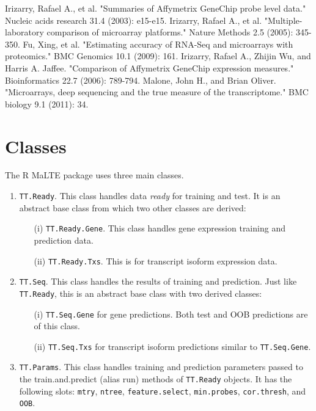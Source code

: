 \documentclass[a4paper,12pt]{article}
\begin{document}
\begin{thebibliography}{50}

 Irizarry, Rafael A., et al. "Summaries of Affymetrix GeneChip probe level data." Nucleic acids research 31.4 (2003): e15-e15.
 Irizarry, Rafael A., et al. "Multiple-laboratory comparison of microarray platforms." Nature Methods 2.5 (2005): 345-350.
 Fu, Xing, et al. "Estimating accuracy of RNA-Seq and microarrays with proteomics." BMC Genomics 10.1 (2009): 161.
 Irizarry, Rafael A., Zhijin Wu, and Harris A. Jaffee. "Comparison of Affymetrix GeneChip expression measures." Bioinformatics 22.7 (2006): 789-794.
 Malone, John H., and Brian Oliver. "Microarrays, deep sequencing and the true measure of the transcriptome." BMC biology 9.1 (2011): 34.

\end{thebibliography}

\pagebreak
\appendix
\section{Classes}
\label{classes}
The \textsf{R} \textsf{MaLTE} package uses three main classes.
\begin{enumerate}
\item \texttt{TT.Ready}. This class handles data \textit{ready} for training and test. It is an abstract base class from which two other classes are derived:
\begin{enumerate}
\item[(i)] \texttt{TT.Ready.Gene}. This class handles gene expression training and prediction data.
\item[(ii)] \texttt{TT.Ready.Txs}. This is for transcript isoform expression data.
\end{enumerate}

\item \texttt{TT.Seq}. This class handles the results of training and prediction. Just like \texttt{TT.Ready}, this is an abstract base class with two derived classes:
\begin{enumerate}
\item[(i)] \texttt{TT.Seq.Gene} for gene predictions. Both test and OOB predictions are of this class.
\item[(ii)] \texttt{TT.Seq.Txs} for transcript isoform predictions similar to \texttt{TT.Seq.Gene}.
\end{enumerate}

\item \texttt{TT.Params}. This class handles training and prediction parameters passed to the train.and.predict (alias run) methods of \texttt{TT.Ready} objects. It has the following slots: \texttt{mtry}, \texttt{ntree}, \texttt{feature.select}, \texttt{min.probes}, \texttt{cor.thresh}, and \texttt{OOB}.
\end{enumerate}
\end{document}
